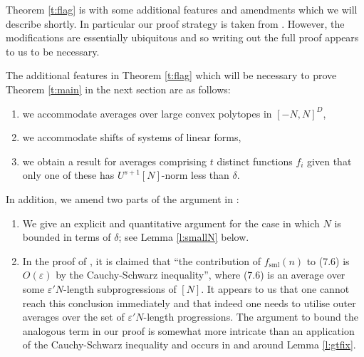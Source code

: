 \documentclass[10pt]{article}
\def\eps{\varepsilon}
\def\sml{\mathrm{sml}}
\begin{document}
Theorem \ref{t:flag} is \cite[Theorem 1.13]{GT10} with some additional features and amendments which we will describe shortly. In particular our proof strategy is taken from \cite[Theorem 1.13]{GT10}. However, the modifications are essentially ubiquitous and so writing out the full proof appears to us to be necessary. 

The additional features in Theorem \ref{t:flag} which will be necessary to prove Theorem \ref{t:main} in the next section are as follows: 
\begin{enumerate}
\item we accommodate averages over large convex polytopes in $[-N,N]^D$,
\item we accommodate shifts of systems of linear forms, 
\item we obtain a result for averages comprising $t$ distinct functions $f_i$ given that only one of these has $U^{s+1}[N]$-norm less than $\delta$.
\end{enumerate}

In addition, we amend two parts of the argument in \cite[Theorem 1.13]{GT10}:
\begin{enumerate}
\item We give an explicit and quantitative argument for the case in which $N$ is bounded in terms of $\delta$; see Lemma \ref{l:smallN} below.
\item In the proof of \cite[Proposition 7.2]{GT10}, it is claimed that ``the contribution of $f_\sml(n)$ to (7.6) is $O(\eps)$ by the Cauchy-Schwarz inequality'', where (7.6) is an average over some  $\eps' N$-length subprogressions of $[N]$. It appears to us that one cannot reach this conclusion immediately and that indeed one needs to utilise outer averages over the set of $\eps'N$-length progressions.  The argument to bound the analogous term in our proof  is somewhat more intricate than an application of the Cauchy-Schwarz inequality and occurs in and around Lemma \ref{l:gtfix}.
\end{enumerate} 
\end{document}
